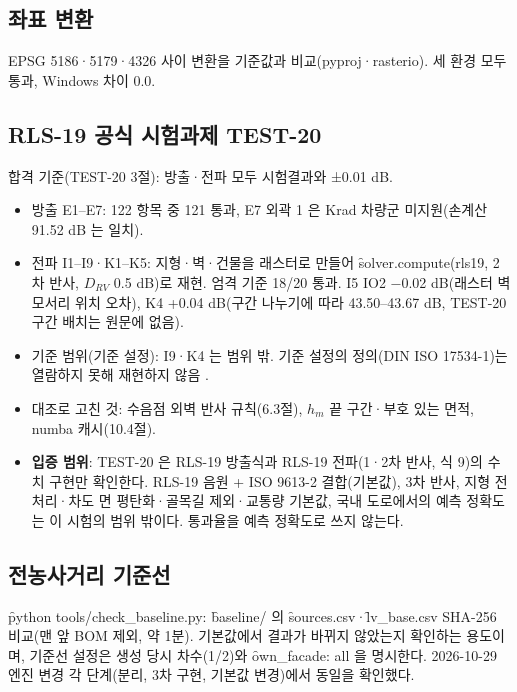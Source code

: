 \documentclass[10.5pt,a4paper]{article}
\begin{document}
\subsection{좌표 변환}
EPSG 5186·5179·4326 사이 변환을 기준값과 비교(pyproj·rasterio). 세 환경 모두 통과, Windows 차이 0.0.

\subsection{RLS-19 공식 시험과제 TEST-20}
합격 기준(TEST-20 3절): 방출·전파 모두 시험결과와 ±0.01 dB.
\begin{itemize}
\item 방출 E1–E7: 122 항목 중 121 통과, E7 외곽 1 은 Krad 차량군 미지원(손계산 91.52 dB 는 일치).
\item 전파 I1–I9·K1–K5: 지형·벽·건물을 래스터로 만들어 \f{solver.compute}(rls19, 2차 반사, $D_{RV}$ 0.5 dB)로 재현. 엄격 기준 18/20 통과. I5 IO2 −0.02 dB(래스터 벽 모서리 위치 오차), K4 +0.04 dB(구간 나누기에 따라 43.50–43.67 dB, TEST-20 구간 배치는 원문에 없음).
\item 기준 범위(기준 설정): I9·K4 는 범위 밖. 기준 설정의 정의(DIN ISO 17534-1)는 열람하지 못해 재현하지 않음 \nob.
\item 대조로 고친 것: 수음점 외벽 반사 규칙(6.3절), $h_m$ 끝 구간·부호 있는 면적, numba 캐시(10.4절).
\item \textbf{입증 범위}: TEST-20 은 RLS-19 방출식과 RLS-19 전파(1·2차 반사, 식 9)의 수치 구현만 확인한다. RLS-19 음원 + ISO 9613-2 결합(기본값), 3차 반사, 지형 전처리·차도 면 평탄화·골목길 제외·교통량 기본값, 국내 도로에서의 예측 정확도는 이 시험의 범위 밖이다. 통과율을 예측 정확도로 쓰지 않는다.
\end{itemize}

\subsection{전농사거리 기준선}
\f{python tools/check\_baseline.py}: \f{baseline/} 의 \f{sources.csv}·\f{lv\_base.csv} SHA-256 비교(맨 앞 BOM 제외, 약 1분). 기본값에서 결과가 바뀌지 않았는지 확인하는 용도이며, 기준선 설정은 생성 당시 차수(1/2)와 \f{own\_facade: all} 을 명시한다. 2026-10-29 엔진 변경 각 단계(분리, 3차 구현, 기본값 변경)에서 동일을 확인했다.
\end{document}
